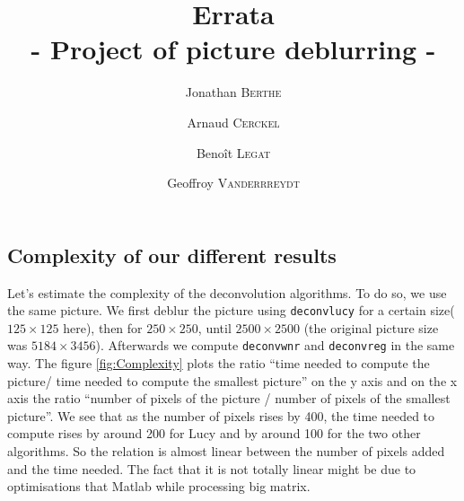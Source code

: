\documentclass{article}
\title{ \textbf{Errata} \\ - Project of picture deblurring - }
\author{Jonathan \textsc{Berthe} \and Arnaud \textsc{Cerckel} \and Benoît \textsc{Legat} \and Geoffroy \textsc{Vanderrreydt}}
\begin{document}
\maketitle

\subsection{Complexity of our different results}


Let's estimate the complexity of the deconvolution algorithms. To do so, we use the same picture. We first deblur the picture using \texttt{deconvlucy} for a certain size($125 \times 125$ here), then for $250 \times 250$, until $2500 \times 2500$ (the original picture  size was $5184 \times 3456$). Afterwards we compute  \texttt{deconvwnr} and \texttt{deconvreg} in the same way. The figure \ref{fig:Complexity} plots the ratio ``time needed to compute the picture/ time needed to compute the smallest picture'' on the y axis and on the x axis the ratio ``number of pixels of the picture / number of pixels of the smallest picture''. We see that as the number of pixels rises by 400, the time needed to compute rises by around 200 for Lucy and by around 100 for the two other algorithms. So the relation is almost linear between the number of pixels added and the time needed. The fact that it is not totally linear might be due to optimisations that Matlab while processing big matrix. 
\end{document}
